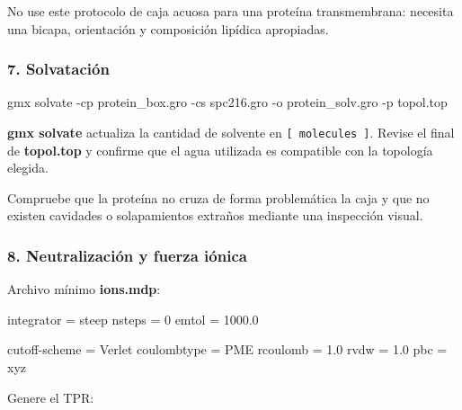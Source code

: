 \documentclass[
  spanish,
  11pt,
  a4paper]{article}
\newenvironment{Shaded}{\begin{snugshade}}{\end{snugshade}}
\newcommand{\AttributeTok}[1]{\textcolor[rgb]{0.13,0.29,0.53}{#1}}
\newcommand{\DataTypeTok}[1]{\textcolor[rgb]{0.13,0.29,0.53}{#1}}
\newcommand{\DecValTok}[1]{\textcolor[rgb]{0.00,0.00,0.81}{#1}}
\newcommand{\ExtensionTok}[1]{#1}
\newcommand{\FloatTok}[1]{\textcolor[rgb]{0.00,0.00,0.81}{#1}}
\newcommand{\NormalTok}[1]{#1}
\newcommand{\OtherTok}[1]{\textcolor[rgb]{0.56,0.35,0.01}{#1}}
\newcommand{\StringTok}[1]{\textcolor[rgb]{0.31,0.60,0.02}{#1}}
\begin{document}
No use este protocolo de caja acuosa para una proteína transmembrana:
necesita una bicapa, orientación y composición lipídica apropiadas.

\subsubsection{7. Solvatación}\label{solvataciuxf3n-1}

\begin{Shaded}
\begin{Highlighting}[]
\ExtensionTok{gmx}\NormalTok{ solvate     }\AttributeTok{{-}cp}\NormalTok{ protein\_box.gro     }\AttributeTok{{-}cs}\NormalTok{ spc216.gro     }\AttributeTok{{-}o}\NormalTok{ protein\_solv.gro     }\AttributeTok{{-}p}\NormalTok{ topol.top}
\end{Highlighting}
\end{Shaded}

\textbf{gmx solvate} actualiza la cantidad de solvente en
\texttt{{[}\ molecules\ {]}}. Revise el final de \textbf{topol.top} y
confirme que el agua utilizada es compatible con la topología elegida.

Compruebe que la proteína no cruza de forma problemática la caja y que
no existen cavidades o solapamientos extraños mediante una inspección
visual.

\subsubsection{8. Neutralización y fuerza
iónica}\label{neutralizaciuxf3n-y-fuerza-iuxf3nica}

Archivo mínimo \textbf{ions.mdp}:

\begin{Shaded}
\begin{Highlighting}[]
\DataTypeTok{integrator      }\OtherTok{=}\StringTok{ steep}
\DataTypeTok{nsteps          }\OtherTok{=}\StringTok{ }\DecValTok{0}
\DataTypeTok{emtol           }\OtherTok{=}\StringTok{ }\FloatTok{1000.0}

\DataTypeTok{cutoff{-}scheme   }\OtherTok{=}\StringTok{ Verlet}
\DataTypeTok{coulombtype     }\OtherTok{=}\StringTok{ PME}
\DataTypeTok{rcoulomb        }\OtherTok{=}\StringTok{ }\FloatTok{1.0}
\DataTypeTok{rvdw            }\OtherTok{=}\StringTok{ }\FloatTok{1.0}
\DataTypeTok{pbc             }\OtherTok{=}\StringTok{ xyz}
\end{Highlighting}
\end{Shaded}

Genere el TPR:
\end{document}
